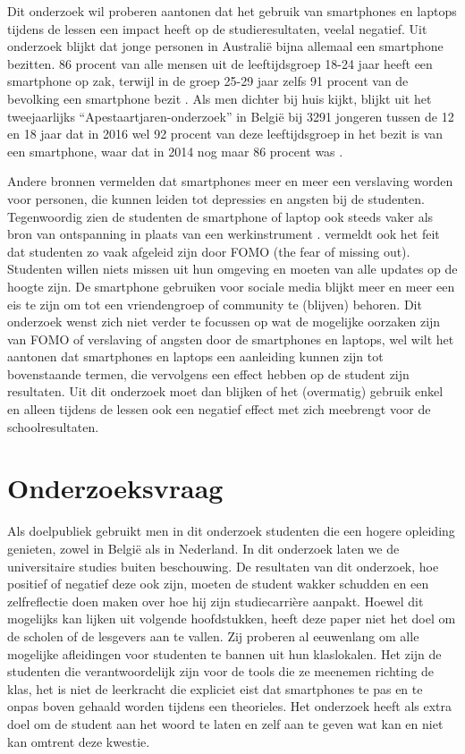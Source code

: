 Dit onderzoek wil proberen aantonen dat het gebruik van smartphones en laptops tijdens de lessen een impact heeft op de studieresultaten, veelal negatief. Uit onderzoek blijkt dat jonge personen in Australië bijna allemaal een smartphone bezitten. 86 procent van alle mensen uit de leeftijdsgroep 18-24 jaar heeft een smartphone op zak, terwijl in de groep 25-29 jaar zelfs 91 procent van de bevolking een smartphone bezit \autocite{Farley2015}. Als men dichter bij huis kijkt, blijkt uit het tweejaarlijks “Apestaartjaren-onderzoek” in België bij 3291 jongeren tussen de 12 en 18 jaar dat in 2016 wel 92 procent van deze leeftijdsgroep in het bezit is van een smartphone, waar dat in 2014 nog maar 86 procent was \autocite{Apestaartjaren2016}.

Andere bronnen \autocite{MatarBoumosleh2017} vermelden dat smartphones meer en meer een verslaving worden voor personen, die kunnen leiden tot depressies en angsten bij de studenten. Tegenwoordig zien de studenten de smartphone of laptop ook steeds vaker als bron van ontspanning in plaats van een werkinstrument \autocite{Baert2018}. \textcite{Baert2018} vermeldt ook het feit dat studenten zo vaak afgeleid zijn door FOMO (the fear of missing out). Studenten willen niets missen uit hun omgeving en moeten van alle updates op de hoogte zijn. De smartphone gebruiken voor sociale media blijkt meer en meer een eis te zijn om tot een vriendengroep of community te (blijven) behoren. Dit onderzoek wenst zich niet verder te focussen op wat de mogelijke oorzaken zijn van FOMO of verslaving of angsten door de smartphones en laptops, wel wilt het aantonen dat smartphones en laptops een aanleiding kunnen zijn tot bovenstaande termen, die vervolgens een effect hebben op de student zijn resultaten. Uit dit onderzoek moet dan blijken of het (overmatig) gebruik enkel en alleen tijdens de lessen ook een negatief effect met zich meebrengt voor de schoolresultaten.

\section{Onderzoeksvraag}
\label{sec:onderzoeksvraag}

Als doelpubliek gebruikt men in dit onderzoek studenten die een hogere opleiding genieten, zowel in België als in Nederland. In dit onderzoek laten we de universitaire studies buiten beschouwing. De resultaten van dit onderzoek, hoe positief of negatief deze ook zijn, moeten de student wakker schudden en een zelfreflectie doen maken over hoe hij zijn studiecarrière aanpakt. Hoewel dit mogelijks kan lijken uit volgende hoofdstukken, heeft deze paper niet het doel om de scholen of de lesgevers aan te vallen. Zij proberen al eeuwenlang om alle mogelijke afleidingen voor studenten te bannen uit hun klaslokalen. Het zijn de studenten die verantwoordelijk zijn voor de tools die ze meenemen richting de klas, het is niet de leerkracht die expliciet eist dat smartphones te pas en te onpas boven gehaald worden tijdens een theorieles. Het onderzoek heeft als extra doel om de student aan het woord te laten en zelf aan te geven wat kan en niet kan omtrent deze kwestie.

